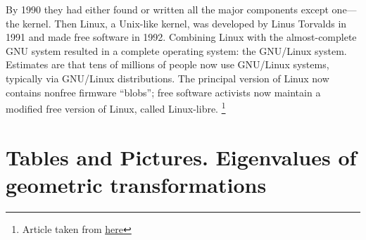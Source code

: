 \documentclass{report}
\begin{document}
By 1990 they had either found or written all the major components except one—the kernel. Then Linux, a Unix-like kernel, was developed by Linus Torvalds in 1991 and made free software in 1992. Combining Linux with the almost-complete GNU system resulted in a complete operating system: the GNU/Linux system. Estimates are that tens of millions of people now use GNU/Linux systems, typically via GNU/Linux distributions. The principal version of Linux now contains nonfree firmware “blobs”; free software activists now maintain a modified free version of Linux, called Linux-libre.
\footnote{Article taken from \href{https://www.gnu.org/gnu/gnu-history.en.html}{\underline{here}}}

\chapter{Tables and Pictures. Eigenvalues of geometric transformations}
\hspace{-4cm}
\end{document}
